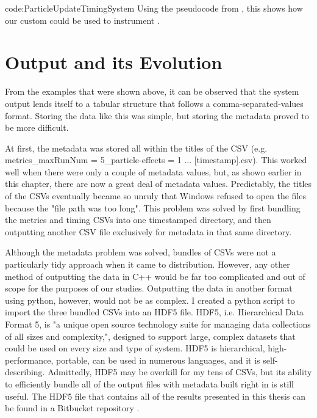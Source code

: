 {code:ParticleUpdateTimingSystem}
{Using the pseudocode from , this shows how our custom  could be used to instrument . }


\section{Output and its Evolution}\label{sec:instr_output}

From the examples that were shown above, it can be observed that the system output lends itself to a tabular structure that follows a comma-separated-values format. Storing the data like this was simple, but storing the metadata proved to be more difficult. 

At first, the metadata was stored all within the titles of the CSV (e.g. metrics\_maxRunNum = 5\_particle-effects = 1 ... [timestamp].csv). This worked well when there were only a couple of metadata values, but, as shown earlier in this chapter, there are now a great deal of metadata values. Predictably, the titles of the CSVs eventually became so unruly that Windows refused to open the files because the "file path was too long". This problem was solved by first bundling the metrics and timing CSVs into one timestamped directory, and then outputting another CSV file exclusively for metadata in that same directory. 

Although the metadata problem was solved, bundles of CSVs were not a particularly tidy approach when it came to distribution. However, any other method of outputting the data in C++ would be far too complicated and out of scope for the purposes of our studies. Outputting the data in another format using python, however, would not be as complex. I created a python script to import the three bundled CSVs into an HDF5 file. HDF5, i.e. Hierarchical Data Format 5, is "a unique open source technology suite for managing data collections of all sizes and complexity,"\cite{HDFGroupHDF5Introduction}, designed to support large, complex datasets that could be used on every size and type of system. HDF5 is hierarchical, high-performance, portable, can be used in numerous languages, and it is self-describing. Admittedly, HDF5 may be overkill for my tens of CSVs, but its ability to efficiently bundle all of the output files with metadata built right in is still useful. The HDF5 file that contains all of the results presented in this thesis can be found in a Bitbucket repository \cite{GrossCSThesisDataset}.


